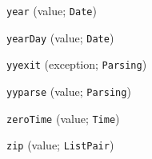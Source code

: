 \begin{description}
\item[] \verb"year" (value; \verb"Date")
\item[] \verb"yearDay" (value; \verb"Date")
\item[] \verb"yyexit" (exception; \verb"Parsing")
\item[] \verb"yyparse" (value; \verb"Parsing")
\\[2ex]

\item[] \verb"zeroTime" (value; \verb"Time")
\item[] \verb"zip" (value; \verb"ListPair")
\end{description}
